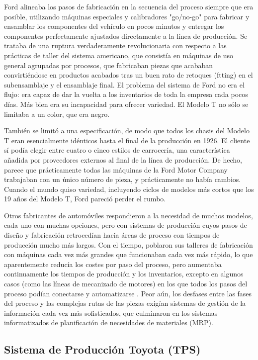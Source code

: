 Ford alineaba los pasos de fabricación en la secuencia del proceso siempre que era posible, utilizando máquinas especiales y calibradores "go/no-go" para fabricar y ensamblar los componentes del vehículo en pocos minutos y entregar los componentes perfectamente ajustados directamente a la línea de producción.
Se trataba de una ruptura verdaderamente revolucionaria con respecto a las prácticas de taller del sistema americano, que consistía en máquinas de uso general agrupadas por procesos, que fabricaban piezas que acababan convirtiéndose en productos acabados tras un buen rato de retoques (ftting) en el subensamblaje y el ensamblaje final.
El problema del sistema de Ford no era el flujo: era capaz de dar la vuelta a los inventarios de toda la empresa cada pocos días.
Más bien era su incapacidad para ofrecer variedad.
El Modelo T no sólo se limitaba a un color, que era negro.

También se limitó a una especificación, de modo que todos los chasis del Modelo T eran esencialmente idénticos hasta el final de la producción en 1926.
El cliente sí podía elegir entre cuatro o cinco estilos de carrocería, una característica añadida por proveedores externos al final de la línea de producción.
De hecho, parece que prácticamente todas las máquinas de la Ford Motor Company trabajaban con un único número de pieza, y prácticamente no había cambios.
Cuando el mundo quiso variedad, incluyendo ciclos de modelos más cortos que los 19 años del Modelo T, Ford pareció perder el rumbo.

Otros fabricantes de automóviles respondieron a la necesidad de muchos modelos, cada uno con muchas opciones, pero con sistemas de producción cuyos pasos de diseño y fabricación retrocedían hacia áreas de proceso con tiempos de producción mucho más largos.
Con el tiempo, poblaron sus talleres de fabricación con máquinas cada vez más grandes que funcionaban cada vez más rápido, lo que aparentemente reducía los costes por paso del proceso, pero aumentaba continuamente los tiempos de producción y los inventarios, excepto en algunos casos (como las líneas de mecanizado de motores) en los que todos los pasos del proceso podían conectarse y automatizarse \cite{hounshell_same_1988}.
Peor aún, los desfases entre las fases del proceso y las complejas rutas de las piezas exigían sistemas de gestión de la información cada vez más sofisticados, que culminaron en los sistemas informatizados de planificación de necesidades de materiales (MRP).

\subsection{Sistema de Producción Toyota (TPS)}

